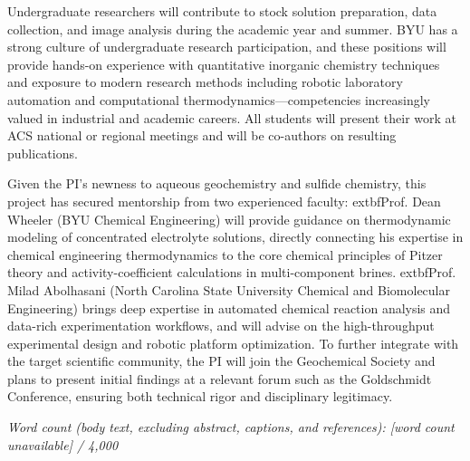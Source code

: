 \documentclass[12pt]{article}
\newcommand{\wordcount}{%
  \IfFileExists{\jobname.wordcount}%
    {\CatchFileDef{\thewordcount}{\jobname.wordcount}{\endlinechar=-1}%
     \thewordcount}%
    {[word count unavailable]}%
}
\begin{document}
Undergraduate researchers will contribute to stock solution preparation, data collection, and image analysis during the academic year and summer. BYU has a strong culture of undergraduate research participation, and these positions will provide hands-on experience with quantitative inorganic chemistry techniques and exposure to modern research methods including robotic laboratory automation and computational thermodynamics---competencies increasingly valued in industrial and academic careers. All students will present their work at ACS national or regional meetings and will be co-authors on resulting publications.

Given the PI's newness to aqueous geochemistry and sulfide chemistry, this project has secured mentorship from two experienced faculty: 	extbf{Prof. Dean Wheeler} (BYU Chemical Engineering) will provide guidance on thermodynamic modeling of concentrated electrolyte solutions, directly connecting his expertise in chemical engineering thermodynamics to the core chemical principles of Pitzer theory and activity-coefficient calculations in multi-component brines. 	extbf{Prof. Milad Abolhasani} (North Carolina State University Chemical and Biomolecular Engineering) brings deep expertise in automated chemical reaction analysis and data-rich experimentation workflows, and will advise on the high-throughput experimental design and robotic platform optimization. To further integrate with the target scientific community, the PI will join the Geochemical Society and plans to present initial findings at a relevant forum such as the Goldschmidt Conference, ensuring both technical rigor and disciplinary legitimacy.

\vspace{1em}
\noindent\textit{Word count (body text, excluding abstract, captions, and references): \wordcount{} / 4{,}000}


\begin{singlespace}


\end{singlespace}
\end{document}
